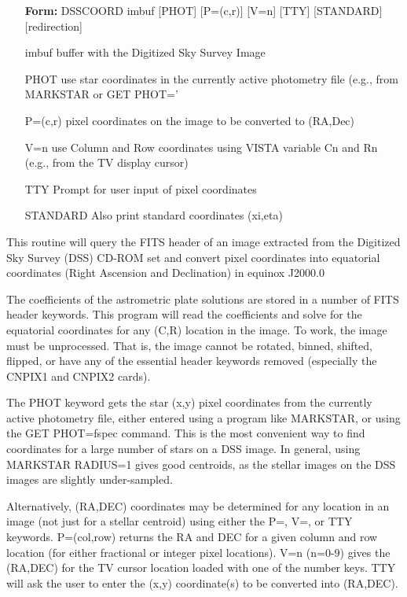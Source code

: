 \begin{itemize}
  \item[\textbf{Form: } DSSCOORD imbuf {[PHOT]} {[P=(c,r)]} {[V=n]} {[TTY]} 
       {[STANDARD]} {[redirection]}\hfill]{}
  \item[imbuf]{buffer with the Digitized Sky Survey Image}
  \item[PHOT]{use star coordinates in the currently active
       photometry file (e.g., from MARKSTAR or GET PHOT='}
  \item[P=(c,r)]{pixel coordinates on the image to be converted to
       (RA,Dec)}
  \item[V=n]{use Column and Row coordinates using VISTA variable
       Cn and Rn (e.g., from the TV display cursor)}
  \item[TTY]{Prompt for user input of pixel coordinates}
  \item[STANDARD]{Also print standard coordinates (xi,eta)}
\end{itemize}

This routine will query the FITS header of an image extracted from the
Digitized Sky Survey (DSS) CD-ROM set and convert pixel coordinates into
equatorial coordinates (Right Ascension and Declination) in equinox J2000.0

The coefficients of the astrometric plate solutions are stored in a number
of FITS header keywords.  This program will read the coefficients and solve
for the equatorial coordinates for any (C,R) location in the image.  To
work, the image must be unprocessed.  That is, the image cannot be rotated,
binned, shifted, flipped, or have any of the essential header keywords
removed (especially the CNPIX1 and CNPIX2 cards).

The PHOT keyword gets the star (x,y) pixel coordinates from the currently
active photometry file, either entered using a program like MARKSTAR, or
using the GET PHOT=fspec command.  This is the most convenient way to find
coordinates for a large number of stars on a DSS image.  In general, using
MARKSTAR RADIUS=1 gives good centroids, as the stellar images on the DSS
images are slightly under-sampled.

Alternatively, (RA,DEC) coordinates may be determined for any location in
an image (not just for a stellar centroid) using either the P=, V=, or TTY
keywords.  P=(col,row) returns the RA and DEC for a given column and row
location (for either fractional or integer pixel locations).  V=n (n=0-9)
gives the (RA,DEC) for the TV cursor location loaded with one of the number
keys.  TTY will ask the user to enter the (x,y) coordinate(s) to be
converted into (RA,DEC).

